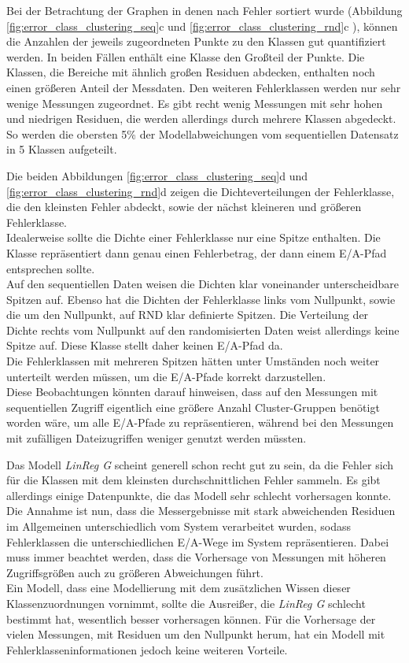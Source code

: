\documentclass[
	12pt,
	a4paper,
	BCOR10mm,
	DIV14,
	listof=totoc,
	bibliography=totoc,
	headsepline
]{scrreprt}
\begin{document}
Bei der Betrachtung der Graphen in denen nach Fehler sortiert wurde (Abbildung \ref{fig:error_class_clustering_seq}c und \ref{fig:error_class_clustering_rnd}c ), können die Anzahlen der jeweils zugeordneten Punkte zu den Klassen gut quantifiziert werden.
In beiden Fällen enthält eine Klasse den Großteil der Punkte.
Die Klassen, die Bereiche mit ähnlich großen Residuen abdecken, enthalten noch einen größeren Anteil der Messdaten. Den weiteren Fehlerklassen werden nur sehr wenige Messungen zugeordnet.
Es gibt recht wenig Messungen mit sehr hohen und niedrigen Residuen, die werden allerdings durch mehrere Klassen abgedeckt. So werden die obersten 5\% der Modellabweichungen vom sequentiellen Datensatz in 5 Klassen aufgeteilt.\medskip

Die beiden Abbildungen \ref{fig:error_class_clustering_seq}d und \ref{fig:error_class_clustering_rnd}d zeigen die Dichteverteilungen der Fehlerklasse, die den kleinsten Fehler abdeckt, sowie der nächst kleineren und größeren Fehlerklasse.\\
Idealerweise sollte die Dichte einer Fehlerklasse nur eine Spitze enthalten. Die Klasse repräsentiert dann genau einen Fehlerbetrag, der dann einem E/A-Pfad entsprechen sollte.\\
Auf den sequentiellen Daten weisen die Dichten klar voneinander unterscheidbare Spitzen auf.
Ebenso hat die Dichten der Fehlerklasse links vom Nullpunkt, sowie die um den Nullpunkt, auf RND klar definierte Spitzen. Die Verteilung der Dichte rechts vom Nullpunkt auf den randomisierten Daten weist allerdings keine Spitze auf. Diese Klasse stellt daher keinen E/A-Pfad da.\\
Die Fehlerklassen mit mehreren Spitzen hätten unter Umständen noch weiter unterteilt werden müssen, um die E/A-Pfade korrekt darzustellen.\\
Diese Beobachtungen könnten darauf hinweisen, dass auf den Messungen mit sequentiellen Zugriff eigentlich eine größere Anzahl Cluster-Gruppen benötigt worden wäre, um alle E/A-Pfade zu repräsentieren, während bei den Messungen mit zufälligen Dateizugriffen weniger genutzt werden müssten. \medskip

Das Modell \textit{LinReg G} scheint generell schon recht gut zu sein, da die Fehler sich für die Klassen mit dem kleinsten durchschnittlichen Fehler sammeln.
Es gibt allerdings einige Datenpunkte, die das Modell sehr schlecht vorhersagen konnte. Die Annahme ist nun, dass die Messergebnisse mit stark abweichenden Residuen im Allgemeinen unterschiedlich vom System verarbeitet wurden, sodass Fehlerklassen die unterschiedlichen E/A-Wege im System repräsentieren. 
Dabei muss immer beachtet werden, dass die Vorhersage von Messungen mit höheren Zugriffsgrößen auch zu größeren Abweichungen führt.\\
Ein Modell, dass eine Modellierung mit dem zusätzlichen Wissen dieser Klassenzuordnungen vornimmt, sollte die Ausreißer, die \textit{LinReg G} schlecht bestimmt hat, wesentlich besser vorhersagen können.
Für die Vorhersage der vielen Messungen, mit Residuen um den Nullpunkt herum, hat ein Modell mit Fehlerklasseninformationen jedoch keine weiteren Vorteile. 
\end{document}

